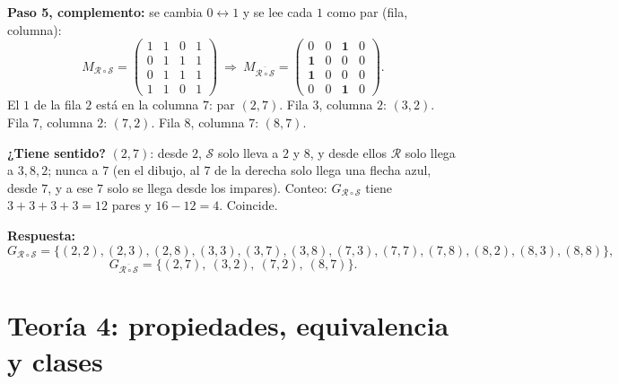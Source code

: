 \documentclass[11pt]{article}
\begin{document}
\begin{explica}
\textbf{Paso 5, complemento:} se cambia $0\leftrightarrow 1$ y se lee cada $1$ como par (fila, columna):
\[
M_{\mathcal R\circ\mathcal S}=\begin{pmatrix}1&1&0&1\\0&1&1&1\\0&1&1&1\\1&1&0&1\end{pmatrix}
\ \Longrightarrow\
M_{\overline{\mathcal R\circ\mathcal S}}=\begin{pmatrix}0&0&\mathbf{1}&0\\\mathbf{1}&0&0&0\\\mathbf{1}&0&0&0\\0&0&\mathbf{1}&0\end{pmatrix}.
\]
El $1$ de la fila $2$ está en la columna $7$: par $(2,7)$. Fila $3$, columna $2$: $(3,2)$. Fila $7$, columna $2$: $(7,2)$. Fila $8$, columna $7$: $(8,7)$.

\textbf{¿Tiene sentido?} $(2,7)$: desde $2$, $\mathcal S$ solo lleva a $2$ y $8$, y desde ellos $\mathcal R$ solo llega a $3,8,2$; nunca a $7$ (en el dibujo, al $7$ de la derecha solo llega una flecha azul, desde $7$, y a ese $7$ solo se llega desde los impares). Conteo: $G_{\mathcal R\circ\mathcal S}$ tiene $3+3+3+3=12$ pares y $16-12=4$. Coincide.
\end{explica}

\textbf{Respuesta:}
\[
G_{\mathcal R\circ\mathcal S}=\{(2,2),(2,3),(2,8),(3,3),(3,7),(3,8),(7,3),(7,7),(7,8),(8,2),(8,3),(8,8)\},
\]
\[
G_{\overline{\mathcal R\circ\mathcal S}}=\{(2,7),\ (3,2),\ (7,2),\ (8,7)\}.
\]

\clearpage
\section*{Teoría 4: propiedades, equivalencia y clases}
\end{document}
